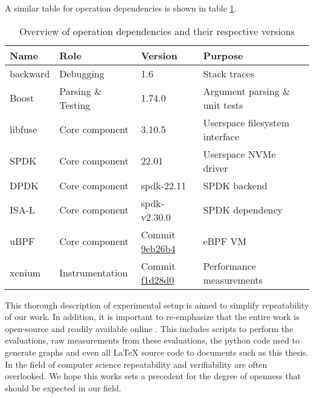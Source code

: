 A similar table for operation dependencies is shown in table
\ref{table:operationdepdencies}.

\begin{table}
    \caption{Overview of operation dependencies and their respective versions}
    \centering
    \begin{adjustbox}{width=1\textwidth}
        \begin{threeparttable}[]
            \begin{tabular}{lllll}
                \toprule
                \textbf{Name} & \textbf{Role} & \textbf{Version} & \textbf{Purpose} \\
                \midrule
                backward & Debugging & 1.6 & Stack traces \\
                Boost & Parsing \& Testing & 1.74.0 & Argument parsing \& unit tests \\
                libfuse & Core component & 3.10.5 & Userspace filesystem interface \\
                SPDK & Core component & 22.01 & Userspace NVMe driver \\
                DPDK & Core component & spdk-22.11 & SPDK backend \\
                ISA-L & Core component & spdk-v2.30.0 & SPDK dependency \\
                uBPF & Core component & Commit \href{https://github.com/iovisor/ubpf/commit/9eb26b4bfdec6cafbf629a056155363f12cec972}{9eb26b4} & eBPF VM \\
                xenium & Instrumentation & Commit \href{https://github.com/mpoeter/xenium/commit/f1d28d0980cf2128c3f6b77d321aad5ca469dbce}{f1d28d0} & Performance measurements \\
                \bottomrule
            \end{tabular}
        \end{threeparttable}
        \label{table:operationdepdencies}
    \end{adjustbox}
\end{table}

This thorough description of experimental setup is aimed to simplify
repeatability of our work. In addition, it is important to re-emphasize that the
entire work is open-source and readily available online \cite{qemu-csd}. This
includes scripts to perform the evaluations, raw measurements from these
evaluations, the python code used to generate graphs and even all LaTeX source
code to documents such as this thesis. In the field of computer science
repeatability and verifiability are often overlooked. We hope this works sets a
precedent for the degree of openness that should be expected in our field.


